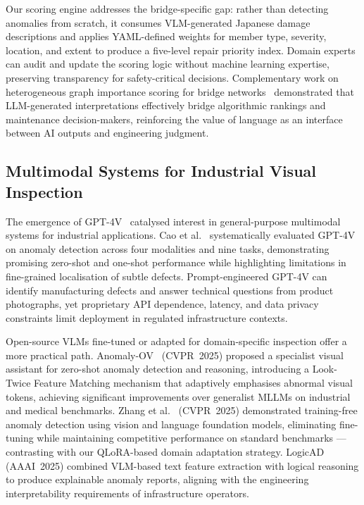 \documentclass[twocolumn]{article}
\begin{document}
Our scoring engine addresses the bridge-specific gap: rather than detecting
anomalies from scratch, it consumes VLM-generated Japanese damage descriptions
and applies YAML-defined weights for member type, severity, location, and
extent to produce a five-level repair priority index.
Domain experts can audit and update the scoring logic without machine learning
expertise, preserving transparency for safety-critical decisions.
Complementary work on heterogeneous graph importance scoring for bridge
networks~\cite{yasuno2026graph} demonstrated that LLM-generated
interpretations effectively bridge algorithmic rankings and maintenance
decision-makers, reinforcing the value of language as an interface between
AI outputs and engineering judgment.

\subsection{Multimodal Systems for Industrial Visual Inspection}

The emergence of GPT-4V~\cite{openai2023gpt4} catalysed interest in
general-purpose multimodal systems for industrial applications.
Cao et al.~\cite{cao2023gpt4vanomaly} systematically evaluated GPT-4V on
anomaly detection across four modalities and nine tasks, demonstrating
promising zero-shot and one-shot performance while highlighting limitations
in fine-grained localisation of subtle defects.
Prompt-engineered GPT-4V can identify manufacturing defects and answer
technical questions from product photographs, yet proprietary API dependence,
latency, and data privacy constraints limit deployment in regulated
infrastructure contexts.

Open-source VLMs fine-tuned or adapted for domain-specific inspection offer
a more practical path.
Anomaly-OV~\cite{xu2025anomalyov} (CVPR~2025) proposed a specialist visual
assistant for zero-shot anomaly detection and reasoning, introducing a
Look-Twice Feature Matching mechanism that adaptively emphasises abnormal
visual tokens, achieving significant improvements over generalist MLLMs on
industrial and medical benchmarks.
Zhang et al.~\cite{zhang2025trainingfree} (CVPR~2025) demonstrated
training-free anomaly detection using vision and language foundation models,
eliminating fine-tuning while maintaining competitive performance on standard
benchmarks --- contrasting with our QLoRA-based domain adaptation strategy.
LogicAD~\cite{jin2025logicad} (AAAI~2025) combined VLM-based text feature
extraction with logical reasoning to produce explainable anomaly reports,
aligning with the engineering interpretability requirements of infrastructure
operators.
\end{document}
